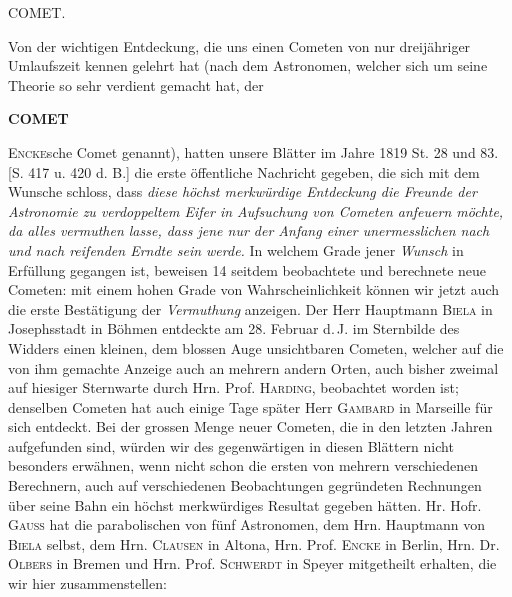 \par{}\bigskip
\hypertarget{native-456-comet}{}
\begin{center}
{\large COMET.}
\end{center}


Von der wichtigen Entdeckung, die uns einen Cometen von nur dreijähriger
Umlaufszeit kennen gelehrt hat (nach dem Astronomen, welcher sich um seine
Theorie so sehr verdient gemacht hat, der\par
\clearpage
\noindent{}%
%
\parbox[t]{\dimexpr\linewidth-24mm\relax}{\centering\footnotesize\bfseries COMET\par}%
\makebox[12mm][r]{}\par\nobreak\medskip
\noindent \textsc{Encke}sche Comet genannt), hatten unsere Blätter im Jahre 1819 St. 28 und 83.
[S. 417 u. 420 d. B.] die erste öffentliche Nachricht gegeben, die sich mit
dem Wunsche schloss, dass \emph{diese höchst merkwürdige Entdeckung die
Freunde der Astronomie zu verdoppeltem Eifer in Aufsuchung von Cometen
anfeuern möchte, da alles vermuthen lasse, dass jene nur der Anfang einer
unermesslichen nach und nach reifenden Erndte sein werde.} In welchem Grade
jener \emph{Wunsch} in Erfüllung gegangen ist, beweisen 14 seitdem
beobachtete und berechnete neue Cometen: mit einem hohen Grade von
Wahrscheinlichkeit können wir jetzt auch die erste Bestätigung der
\emph{Vermuthung} anzeigen. Der Herr Hauptmann \textsc{Biela} in Josephsstadt in
Böhmen entdeckte am 28. Februar d.\,J. im Sternbilde des Widders einen
kleinen, dem blossen Auge unsichtbaren Cometen, welcher auf die von ihm
gemachte Anzeige auch an mehrern andern Orten, auch bisher zweimal auf
hiesiger Sternwarte durch Hrn. Prof. \textsc{Harding}, beobachtet worden ist;
denselben Cometen hat auch einige Tage später Herr \textsc{Gambard} in Marseille für
sich entdeckt. Bei der grossen Menge neuer Cometen, die in den letzten Jahren
aufgefunden sind, würden wir des gegenwärtigen in diesen Blättern nicht
besonders erwähnen, wenn nicht schon die ersten von mehrern verschiedenen
Berechnern, auch auf verschiedenen Beobachtungen gegründeten Rechnungen über
seine Bahn ein höchst merkwürdiges Resultat gegeben hätten. Hr. Hofr. \textsc{Gauss}
hat die parabolischen von fünf Astronomen, dem Hrn. Hauptmann von \textsc{Biela}
selbst, dem Hrn. \textsc{Clausen} in Altona, Hrn. Prof. \textsc{Encke} in Berlin, Hrn.
Dr. \textsc{Olbers} in Bremen und Hrn. Prof. \textsc{Schwerdt} in Speyer mitgetheilt erhalten,
die wir hier zusammenstellen:

